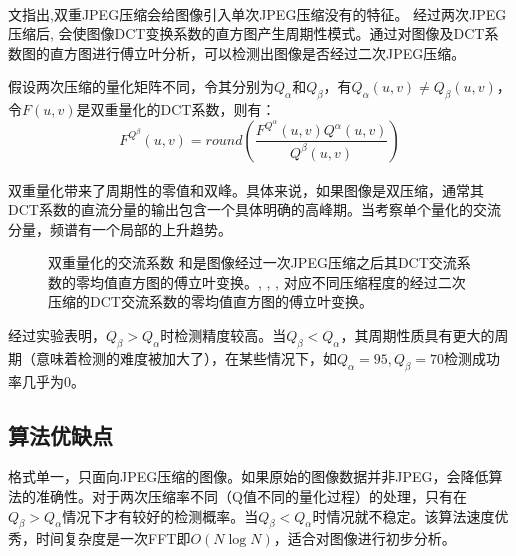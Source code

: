 \documentclass[a4paper, 10pt, notitlepage]{report}
\newcommand{\supercite}[1]{\textsuperscript{\cite{#1}}}
\begin{document}
			文\supercite{jpegghost}指出,双重JPEG压缩会给图像引入单次JPEG压缩没有的特征。 经过两次JPEG压缩后, 会使图像DCT变换系数的直方图产生周期性模式。通过对图像及DCT系数图的直方图进行傅立叶分析，可以检测出图像是否经过二次JPEG压缩。

			假设两次压缩的量化矩阵不同，令其分别为$Q_\alpha$和$Q_\beta$，有$Q_\alpha(u,v) \neq Q_\beta(u,v)$，令$F(u,v)$是双重量化的DCT系数，则有：
			\begin{equation}
				F^{Q^\beta}(u,v) = round(\frac{F^{Q^\alpha}(u,v)Q^\alpha(u,v)}{Q^\beta(u,v)})
			\end{equation}

			双重量化带来了周期性的零值和双峰\supercite{mahdian2009detecting}。具体来说，如果图像是双压缩，通常其DCT系数的直流分量的输出包含一个具体明确的高峰期。当考察单个量化的交流分量，频谱有一个局部的上升趋势。

			\begin{figure}[htp]
				\centering
				\caption{双重量化的交流系数 和是图像经过一次JPEG压缩之后其DCT交流系数的零均值直方图的傅立叶变换。, , ,  对应不同压缩程度的经过二次压缩的DCT交流系数的零均值直方图的傅立叶变换。}
				\label{fig-ac}
			\end{figure}

			经过实验表明，$Q_\beta > Q_\alpha$时检测精度较高。当$Q_\beta < Q_\alpha$，其周期性质具有更大的周期（意味着检测的难度被加大了），在某些情况下，如$Q_\alpha = 95,Q_\beta = 70$检测成功率几乎为0。

		\subsection{算法优缺点}
			格式单一，只面向JPEG压缩的图像。如果原始的图像数据并非JPEG，会降低算法的准确性。对于两次压缩率不同（Q值不同的量化过程）的处理，只有在$Q_\beta > Q_\alpha$情况下才有较好的检测概率。当$Q_\beta < Q_\alpha$时情况就不稳定。该算法速度优秀，时间复杂度是一次FFT即$O(N\log N)$，适合对图像进行初步分析。
\end{document}
